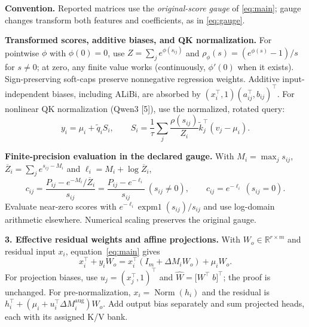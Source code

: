 \documentclass[10pt,a4paper]{article}
\newcommand{\R}{\mathbb R}
\newcommand{\T}{^{\!\top}}
\newcommand{\ddM}{\Delta M}
\begin{document}
\textbf{Convention.}
Reported matrices use the \emph{original-score gauge} of \eqref{eq:main}; gauge
changes transform both features and coefficients, as in \eqref{eq:gauge}.

\textbf{Transformed scores, additive biases, and QK normalization.}
For pointwise $\phi$ with $\phi(0)=0$, use $Z=\sum_j e^{\phi(s_{ij})}$ and
$\rho_\phi(s)=(e^{\phi(s)}-1)/s$ for $s\ne0$; at zero, any finite value works
(continuously, $\phi'(0)$ when it exists). Sign-preserving soft-caps preserve
nonnegative regression weights. Additive input-independent biases, including ALiBi,
are absorbed by $(x_i\T,1)(a_{ij}\T,b_{ij})\T$.
For nonlinear QK normalization (Qwen3 [5]), use the normalized, rotated query:
\begin{equation}
y_i=\mu_i+\widetilde q_i S_i,\qquad
S_i=\frac1\tau\sum_j\frac{\rho(s_{ij})}{Z_i}\widetilde k_j\T(v_j-\mu_i).
\label{eq:qknorm}
\end{equation}

\textbf{Finite-precision evaluation in the declared gauge.}
With $M_i=\max_j s_{ij}$,
$\overline Z_i=\sum_j e^{s_{ij}-M_i}$ and $\ell_i=M_i+\log\overline Z_i$,
\begin{equation}
c_{ij}=\frac{P_{ij}-e^{-M_i}/\overline Z_i}{s_{ij}}
=\frac{P_{ij}-e^{-\ell_i}}{s_{ij}}\ (s_{ij}\ne0),\qquad
c_{ij}=e^{-\ell_i}\ (s_{ij}=0).
\label{eq:stable}
\end{equation}
Evaluate near-zero scores with $e^{-\ell_i}\operatorname{expm1}(s_{ij})/s_{ij}$
and use log-domain arithmetic elsewhere. Numerical scaling preserves the original gauge.

\medskip

\fontsize{10}{15.8}\selectfont
\setlength{\parskip}{10pt}
\textbf{3. Effective residual weights and affine projections.}
With $W_o\in\R^{r\times m}$ and residual input $x_i$, equation~\eqref{eq:main} gives
\begin{equation}
x_i\T+y_iW_o=x_i\T(I_m+\ddM_iW_o)+\mu_iW_o.
\label{eq:residual}
\end{equation}
For projection biases, use $u_j=(x_j\T,1)\T$ and
$\widehat W=\bigl[W\T\;b\bigr]\T$; the proof is unchanged.
For pre-normalization, $x_i=\operatorname{Norm}(h_i)$ and the residual is
$h_i\T+(\mu_i+u_i\T\ddM_i^{\mathrm{aug}})W_o$.
Add output bias separately and sum projected heads, each with its assigned K/V bank.
\end{document}
